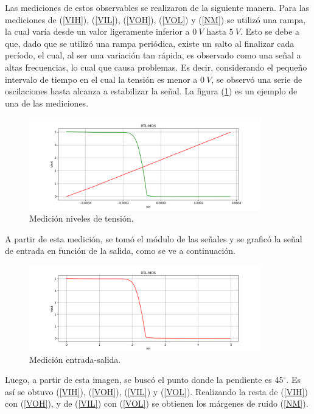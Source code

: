 Las mediciones de estos observables se realizaron de la siguiente manera. Para las mediciones de (\ref{VIH}), (\ref{VIL}), (\ref{VOH}), (\ref{VOL}) y (\ref{NM}) se utilizó una rampa, la cual varía desde un valor ligeramente inferior a $0 \ V$ hasta $5 \ V$. Esto se debe a que, dado que se utilizó una rampa periódica, existe un salto al finalizar cada período, el cual, al ser una variación tan rápida, es observado como una señal a altas frecuencias, lo cual que causa problemas. Es decir, considerando el pequeño intervalo de tiempo en el cual la tensión es menor a $0 \ V$, se observó una serie de oscilaciones hasta alcanza a estabilizar la señal. La figura (\ref{fig:medramp}) es un ejemplo de una de las mediciones.
\begin{figure}[H]	
	\centering
	\includegraphics[width=0.9\textwidth]{ImagenesEjercicio1/DC-SWEEP/MedicionRampa.PNG}
	\caption{Medición niveles de tensión.}
	\label{fig:medramp}
\end{figure}

A partir de esta medición, se tomó el módulo de las señales y se graficó la señal de entrada en función de la salida, como se ve a continuación.
\begin{figure}[H]	
	\centering
	\includegraphics[width=0.9\textwidth]{ImagenesEjercicio1/DC-SWEEP/EntradaSalida.PNG}
	\caption{Medición entrada-salida.}
	\label{fig:medinout}
\end{figure}

Luego, a partir de esta imagen, se buscó el punto donde la pendiente es 45$^{\circ}$. Es así se obtuvo (\ref{VIH}), (\ref{VOH}), (\ref{VIL}) y (\ref{VOL}). Realizando la resta de (\ref{VIH}) con (\ref{VOH}), y de (\ref{VIL}) con (\ref{VOL}) se obtienen los márgenes de ruido (\ref{NM}).

